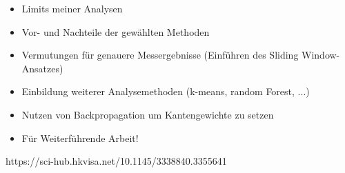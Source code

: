 
\begin{itemize}
	\item Limits meiner Analysen
	\item Vor- und Nachteile der gewählten Methoden
	\item Vermutungen für genauere Messergebnisse (Einführen des Sliding Window-Ansatzes)
	\item Einbildung weiterer Analysemethoden (k-means, random Forest, ...)
	\item Nutzen von Backpropagation um Kantengewichte zu setzen
	\item Für Weiterführende Arbeit!
\end{itemize}


https://sci-hub.hkvisa.net/10.1145/3338840.3355641
